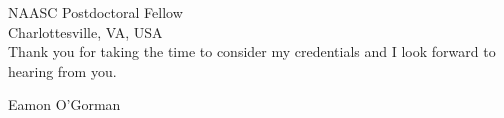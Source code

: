 \documentclass[10pt]{letter} %
\begin{document}
\begin{letter}{NAASC Postdoctoral Fellow \\
Charlottesville, VA, USA \\
}
Thank you for taking the time to consider my credentials and I look forward to hearing from you.

Eamon O'Gorman
\\
\\
\\
\\
\\
\\
\\
\\
\end{letter}
 
\end{document}

